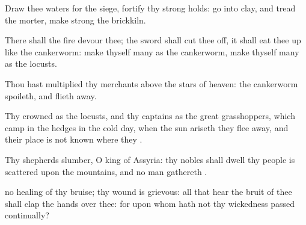 {Draw thee
waters for the
siege,
fortify thy strong
holds:
go into
clay, and
tread the
morter, make
strong the
brickkiln.

There shall the
fire
devour thee; the
sword shall cut thee
off, it shall eat thee
up like the
cankerworm: make thyself
many as the
cankerworm, make thyself
many as the
locusts.

Thou hast
multiplied thy
merchants above the
stars of
heaven: the
cankerworm
spoileth, and flieth
away.

Thy
crowned
{} as the
locusts, and thy
captains as the great
grasshoppers, which
camp in the
hedges in the
cold
day,
{} when the
sun
ariseth they flee
away, and their
place is not
known
where they
{}.

Thy
shepherds
slumber, O
king of
Assyria: thy
nobles shall
dwell
{} thy
people is
scattered upon the
mountains, and no man
gathereth
{}.

 no
healing of thy
bruise; thy
wound is
grievous: all that
hear the
bruit of thee shall
clap the
hands over thee: for upon whom hath not thy
wickedness
passed
continually?


\par }